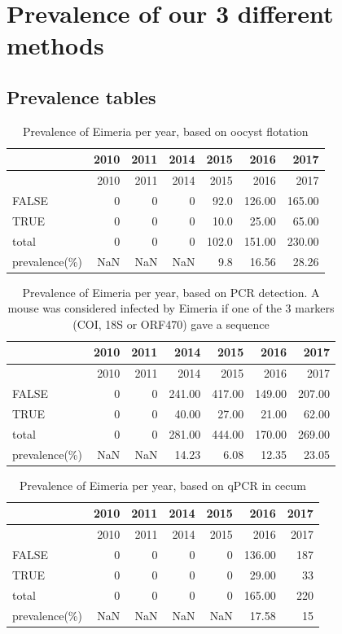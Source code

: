 \documentclass[]{article}
\begin{document}
\section{Prevalence of our 3 different
methods}\label{prevalence-of-our-3-different-methods}

\subsection{Prevalence tables}\label{prevalence-tables}

\begin{longtable}[]{@{}lrrrrrr@{}}
\caption{Prevalence of Eimeria per year, based on oocyst
flotation}\tabularnewline
\toprule
& 2010 & 2011 & 2014 & 2015 & 2016 & 2017\tabularnewline
\midrule
\endfirsthead
\toprule
& 2010 & 2011 & 2014 & 2015 & 2016 & 2017\tabularnewline
\midrule
\endhead
FALSE & 0 & 0 & 0 & 92.0 & 126.00 & 165.00\tabularnewline
TRUE & 0 & 0 & 0 & 10.0 & 25.00 & 65.00\tabularnewline
total & 0 & 0 & 0 & 102.0 & 151.00 & 230.00\tabularnewline
prevalence(\%) & NaN & NaN & NaN & 9.8 & 16.56 & 28.26\tabularnewline
\bottomrule
\end{longtable}

\begin{longtable}[]{@{}lrrrrrr@{}}
\caption{Prevalence of Eimeria per year, based on PCR detection. A mouse
was considered infected by Eimeria if one of the 3 markers (COI, 18S or
ORF470) gave a sequence}\tabularnewline
\toprule
& 2010 & 2011 & 2014 & 2015 & 2016 & 2017\tabularnewline
\midrule
\endfirsthead
\toprule
& 2010 & 2011 & 2014 & 2015 & 2016 & 2017\tabularnewline
\midrule
\endhead
FALSE & 0 & 0 & 241.00 & 417.00 & 149.00 & 207.00\tabularnewline
TRUE & 0 & 0 & 40.00 & 27.00 & 21.00 & 62.00\tabularnewline
total & 0 & 0 & 281.00 & 444.00 & 170.00 & 269.00\tabularnewline
prevalence(\%) & NaN & NaN & 14.23 & 6.08 & 12.35 & 23.05\tabularnewline
\bottomrule
\end{longtable}

\begin{longtable}[]{@{}lrrrrrr@{}}
\caption{Prevalence of Eimeria per year, based on qPCR in
cecum}\tabularnewline
\toprule
& 2010 & 2011 & 2014 & 2015 & 2016 & 2017\tabularnewline
\midrule
\endfirsthead
\toprule
& 2010 & 2011 & 2014 & 2015 & 2016 & 2017\tabularnewline
\midrule
\endhead
FALSE & 0 & 0 & 0 & 0 & 136.00 & 187\tabularnewline
TRUE & 0 & 0 & 0 & 0 & 29.00 & 33\tabularnewline
total & 0 & 0 & 0 & 0 & 165.00 & 220\tabularnewline
prevalence(\%) & NaN & NaN & NaN & NaN & 17.58 & 15\tabularnewline
\bottomrule
\end{longtable}
\end{document}
